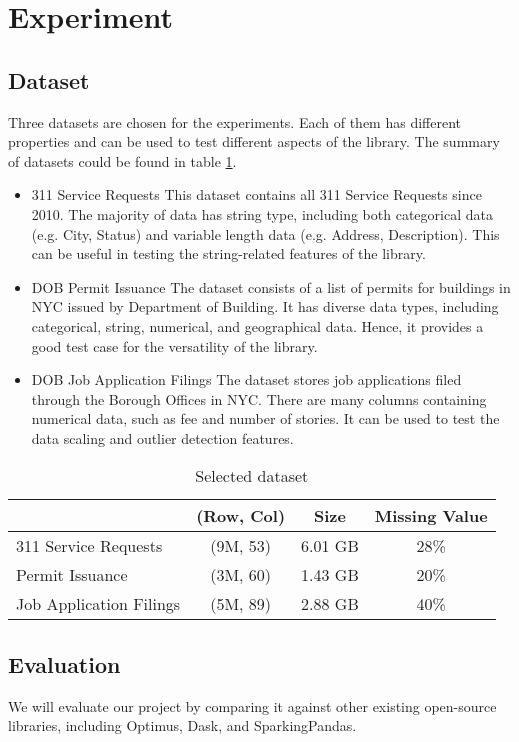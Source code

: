 \documentclass[sigconf]{acmart}
\begin{document}
\section{Experiment}
\subsection{Dataset}
Three datasets are chosen for the experiments. Each of them has different properties and can be used to test different aspects of the library. The summary of datasets could be found in table \ref{tab:dataset}.
\begin{itemize}
	\item{311 Service Requests}\cite{nycopendata1} This dataset contains all 311 Service Requests since 2010. The majority of data has string type, including both categorical  data (e.g. City, Status) and variable length data (e.g. Address, Description). This can be useful in testing the string-related features of the library.
	\item{DOB Permit Issuance}\cite{nycopendata2} The dataset consists of a list of permits for buildings in NYC issued by Department of Building. It has diverse data types, including categorical, string, numerical, and geographical data. Hence, it provides a good test case for the versatility of the library. 
	\item{DOB Job Application Filings}\cite{nycopendata3} The dataset stores job applications filed through the Borough Offices in NYC. There are many columns containing numerical data, such as fee and number of stories. It can be used to test the data scaling and outlier detection features. 
\end{itemize}

\begin{table}
\caption{Selected dataset}   
\label{tab:dataset}
\begin{tabular}{lccc}   
 		                 & (Row, Col)  & Size      & Missing Value  \\  
\hline
 311 Service Requests   & (9M, 53)     & 6.01 GB  & 28\%            \\ 
 Permit Issuance            & (3M, 60)     & 1.43 GB  & 20\%             \\  
 Job Application Filings   & (5M, 89)     & 2.88 GB  & 40\%             \\ 


\end{tabular}   
\end{table}

\subsection{Evaluation}
We will evaluate our project by comparing it against other existing open-source libraries, including Optimus\cite{optimus}, Dask\cite{dask}, and SparkingPandas\cite{sparklingpandas}. 
\end{document}
